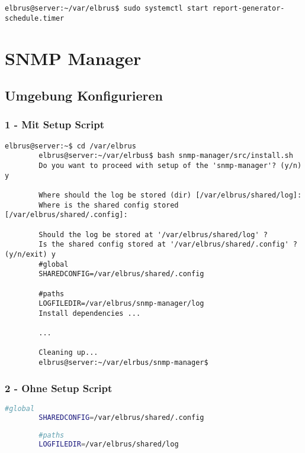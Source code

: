 \documentclass{article}
\begin{document}
	\begin{lstlisting}[caption={Starten des Zeitplanungsprogrammes.}]
		elbrus@server:~/var/elbrus$ sudo systemctl start report-generator-schedule.timer
	\end{lstlisting}
	\newpage
	
	
	\section{SNMP Manager}
	\lstset{style=commands}

	\subsection[file config]{Umgebung Konfigurieren}
	\subsubsection{1 - Mit Setup Script}
	\lstset{style=commands}
	\begin{lstlisting}[caption={Ausführen des 'install.sh' Scripts.}]
		elbrus@server:~$ cd /var/elbrus
		elbrus@server:~/var/elrbus$ bash snmp-manager/src/install.sh
		Do you want to proceed with setup of the 'snmp-manager'? (y/n) y
		
		Where should the log be stored (dir) [/var/elbrus/shared/log]:
		Where is the shared config stored [/var/elbrus/shared/.config]:
		
		Should the log be stored at '/var/elbrus/shared/log' ?
		Is the shared config stored at '/var/elbrus/shared/.config' ? (y/n/exit) y
		#global
		SHAREDCONFIG=/var/elbrus/shared/.config
		
		#paths
		LOGFILEDIR=/var/elbrus/snmp-manager/log
		Install dependencies ...
		
		...
		
		Cleaning up...
		elbrus@server:~/var/elrbus/snmp-manager$
	\end{lstlisting}
	
	\subsubsection{2 - Ohne Setup Script}
	\lstset{style=files}
	\begin{lstlisting}[caption={Anhand von '.env.example' eigene '.env' Datei anlegen.}, language=bash, keywords={CONFIGPATH, MAINPATH}, keywordstyle=\color{red}, firstnumber=17]
		#global
		SHAREDCONFIG=/var/elbrus/shared/.config
		
		#paths
		LOGFILEDIR=/var/elbrus/shared/log
	\end{lstlisting}
	
\end{document}
